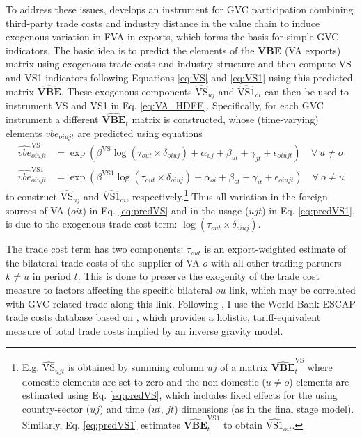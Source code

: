 \documentclass[a4paper]{article}
\begin{document}
To address these issues, \citet{Kummritz20161} develops an instrument for GVC participation combining third-party trade costs and industry distance in the value chain to induce exogenous variation in FVA in exports, which forms the basis for simple GVC indicators. The basic idea is to predict the elements of the \textbf{VBE} (VA exports) matrix using exogenous trade costs and industry structure and then compute VS and VS1 indicators following Equations \ref{eq:VS} and \ref{eq:VS1} using this predicted matrix $\hat{\textbf{VBE}}$. These exogenous components $\hat{\text{VS}}_{uj}$ and $\hat{\text{VS1}}_{oi}$ can then be used to instrument VS and VS1 in Eq. \ref{eq:VA_HDFE}. Specifically, for each GVC instrument a different $\hat{\textbf{VBE}}_t$ matrix is constructed, whose (time-varying) elements $vbe_{oiujt}$ are predicted using equations
%
\begin{align} \label{eq:predVS}
\hat{vbe}_{oiujt}^\text{VS} &= \exp(\beta^\text{VS} \log(\tau_{out}\times \delta_{oiuj}) + \alpha_{uj} + \beta_{ut} +\gamma_{jt} + \epsilon_{oiujt}) \quad \forall\  u\neq o \\ \label{eq:predVS1}
\hat{vbe}_{oiujt}^\text{VS1} &= \exp(\beta^\text{VS1} \log(\tau_{out}\times \delta_{oiuj}) + \alpha_{oi} + \beta_{ot} +\gamma_{it} + \epsilon_{oiujt}) \quad \forall\  o\neq u
\end{align}
%
to construct $\hat{\text{VS}}_{uj}$ and $\hat{\text{VS1}}_{oi}$, respectively.\footnote{E.g. $\hat{\text{VS}}_{ujt}$ is obtained by summing column $uj$ of a matrix $\hat{\textbf{VBE}}_t^\text{VS}$ where domestic elements are set to zero and the non-domestic ($u\neq o$) elements are estimated using Eq. \ref{eq:predVS}, which includes fixed effects for the using country-sector ($uj$) and time ($ut$, $jt$) dimensions (as in the final stage model). Similarly, Eq. \ref{eq:predVS1} estimates $\hat{\textbf{VBE}}_t^\text{VS1}$ to obtain $\hat{\text{VS1}}_{oit}$. \vspace{-5mm} } Thus all variation in the foreign sources of VA ($oit$) in Eq. \ref{eq:predVS} and in the usage ($ujt$) in Eq. \ref{eq:predVS1}, is due to the exogenous trade cost term: $\log(\tau_{out}\times \delta_{oiuj})$. \newline

The trade cost term has two components: $\tau_{out}$ is an export-weighted estimate of the bilateral trade costs of the supplier of VA $o$ with all other trading partners $k\neq u$ in period $t$. This is done to preserve the exogenity of the trade cost measure to factors affecting the specific bilateral $ou$ link, which may be correlated with GVC-related trade along this link. Following \citet{Kummritz20161}, I use the World Bank ESCAP trade costs database \citep{arvis2016trade} based on \citet{novy2013gravity}, which provides a holistic, tariff-equivalent measure of total trade costs implied by an inverse gravity model. \newline 
\end{document}
